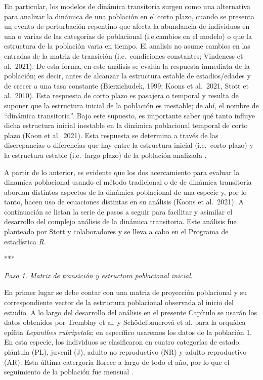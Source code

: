 \documentclass[
]{book}
\theoremstyle{definition}
\theoremstyle{definition}
\theoremstyle{definition}
\theoremstyle{definition}
\theoremstyle{remark}
\begin{document}
En particular, los modelos de dinámica transitoria surgen como una alternativa para analizar la dinámica de una población en el corto plazo, cuando se presenta un evento de perturbación repentino que afecta la abundancia de individuos en una o varias de las categorías de poblacional (i.e.cambios en el modelo) o que la estructura de la población varia en tiempo. El analisis no asume cambios en las entradas de la matriz de transición (i.e.~condiciones constantes; Vindeness et al.~2021). De esta forma, en este análisis se evalúa la respuesta inmediata de la población; es decir, antes de alcanzar la estructura estable de estadios/edades y de crecer a una tasa constante (Bierzichudek, 1999; Koons et al.~2021, Stott et al.~2010). Esta respuesta de corto plazo es pasajera o temporal y resulta de suponer que la estructura inicial de la población es inestable; de ahí, el nombre de ``dinámica transitoria''. Bajo este supuesto, es importante saber qué tanto influye dicha estructura inicial inestable en la dinámica poblacional temporal de corto plazo (Koon et al.~2021). Esta respuesta se determina a través de las discrepancias o diferencias que hay entre la estructura inicial (i.e.~corto plazo) y la estructura estable (i.e.~largo plazo) de la población analizada \citep{raventos2015transient}.

A partir de lo anterior, es evidente que los dos acercamiento para evaluar la dinamica poblacional usando el método tradicional o de de dinámica transitoria abordan distintos aspectos de la dinámica poblacional de una especie y, por lo tanto, hacen uso de ecuaciones distintas en su análisis (Koons et al.~2021). A continuación se listan la serie de pasos a seguir para facilitar y asimilar el desarrollo del complejo análisis de la dinámica transitoria. Este análisis fue planteado por Stott y colaboradores \citep{stott2011framework, stott2012beyond, stott2012popdemo} y se lleva a cabo en el Programa de estadística \emph{R}.

***

\emph{Paso 1. Matriz de transición y estructura poblacional inicial}.

En primer lugar se debe contar con una matriz de proyección poblacional y su correspondiente vector de la estructura poblacional observada al inicio del estudio. A lo largo del desarrollo del análisis en el presente Capítulo se usarán los datos obtenidos por Tremblay et al. \citep{tremblay2015stable} y Schödelbauerová et al. \citep{schodelbauerova2010prediction} para la orquídea epífita \emph{Lepanthes rubripetala}; en específico usaremos los datos de la población 1. En esta especie, los individuos se clasificaron en cuatro categorías de estado: plántula (PL), juvenil (J), adulto no reproductivo (NR) y adulto reproductivo (AR). Esta última catergoría florece a largo de todo el año, por lo que el seguimiento de la población fue mensual \citep{tremblay2015stable, schodelbauerova2010prediction}.
\end{document}

